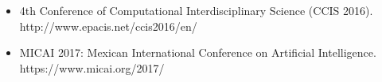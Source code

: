 \begin{itemize}
	\item 4th Conference of Computational Interdisciplinary Science (CCIS 2016). http://www.epacis.net/ccis2016/en/
	\item MICAI 2017: Mexican International Conference on Artificial Intelligence. https://www.micai.org/2017/ 
\end{itemize}







